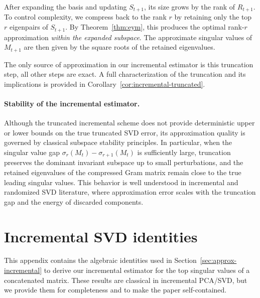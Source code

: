 \documentclass[10pt]{article} %
\begin{document}
After expanding the basis and updating $S_{t+1}$, its size grows by 
the rank of $R_{t+1}$.  
To control complexity, we compress back to the rank $r$ by retaining only the top 
$r$ eigenpairs of $S_{t+1}$.  
By Theorem~\ref{thm:eym}, this produces the optimal rank-$r$ approximation
\emph{within the expanded subspace}.  
The approximate singular values of $M_{t+1}$ are then given by
the square roots of the retained eigenvalues.

The only source of approximation in our incremental estimator is this 
truncation step, all other steps are exact.  
A full characterization of the truncation and its implications is provided in 
Corollary~\ref{cor:incremental-truncated}.

\paragraph{Stability of the incremental estimator.}
Although the truncated incremental scheme does not provide deterministic upper or lower bounds on the true truncated SVD error, its approximation quality is governed by classical subspace stability principles. In particular, when the singular value gap $\sigma_r(M_t) - \sigma_{r+1}(M_t)$ is sufficiently large, truncation preserves the dominant invariant subspace up to small perturbations, and the retained eigenvalues of the compressed Gram matrix remain close to the true leading singular values. This behavior is well understood in incremental and randomized SVD literature, where approximation error scales with the truncation gap and the energy of discarded components.

\section{Incremental SVD identities}
\label{appendix:incremental_svd}
This appendix contains the algebraic identities used in Section~\ref{sec:approx-incremental} to derive
our incremental estimator for the top singular values of a concatenated
matrix.  These results are classical in incremental PCA/SVD, but we provide
them for completeness and to make the paper self-contained.
\end{document}
